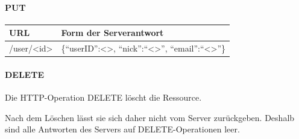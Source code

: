 \paragraph{PUT}
\begin{center}
\begin{longtable}{| p{4.1cm} | p{10cm} |}
\hline
URL & Form der Serverantwort \\
\hline \hline
/user/<id> & \{``userID'':<>, ``nick'':``<>'', ``email'':``<>''\} \\
\hline
\end{longtable}
\end{center}

\paragraph{DELETE}
Die HTTP-Operation DELETE löscht die Ressource.

Nach dem Löschen lässt sie sich daher nicht vom Server zurückgeben. Deshalb sind alle Antworten des Servers auf DELETE-Operationen leer.